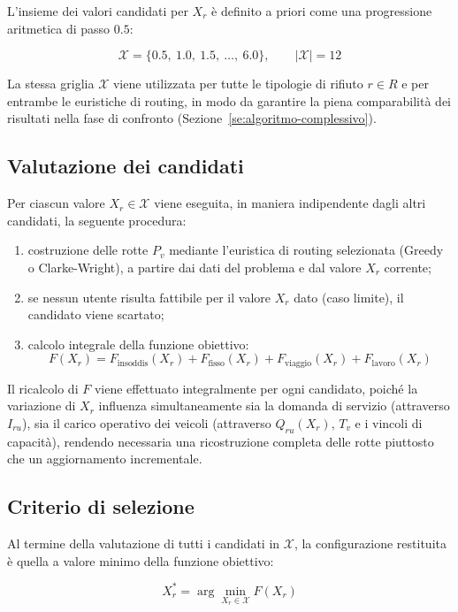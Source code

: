 L'insieme dei valori candidati per $X_r$ è definito a priori come una progressione aritmetica di passo $0.5$:

\[
\mathcal{X} = \{0.5,\ 1.0,\ 1.5,\ \dots,\ 6.0\}, \qquad |\mathcal{X}| = 12
\]

La stessa griglia $\mathcal{X}$ viene utilizzata per tutte le tipologie di rifiuto $r \in R$ e per entrambe le euristiche di routing, in modo da garantire la piena comparabilità dei risultati nella fase di confronto (Sezione~\ref{se:algoritmo-complessivo}).

\subsection{Valutazione dei candidati}

Per ciascun valore $X_r \in \mathcal{X}$ viene eseguita, in maniera indipendente dagli altri candidati, la seguente procedura:

\begin{enumerate}
	\item costruzione delle rotte $P_v$ mediante l'euristica di routing selezionata (Greedy o Clarke-Wright), a partire dai dati del problema e dal valore $X_r$ corrente;
	\item se nessun utente risulta fattibile per il valore $X_r$ dato (caso limite), il candidato viene scartato;
	\item calcolo integrale della funzione obiettivo:
	\[
	F(X_r) = F_{\text{insoddis}}(X_r) + F_{\text{fisso}}(X_r) + F_{\text{viaggio}}(X_r) + F_{\text{lavoro}}(X_r)
	\]
\end{enumerate}

Il ricalcolo di $F$ viene effettuato integralmente per ogni candidato, poiché la variazione di $X_r$ influenza simultaneamente sia la domanda di servizio (attraverso $I_{ru}$), sia il carico operativo dei veicoli (attraverso $Q_{ru}(X_r)$, $T_v$ e i vincoli di capacità), rendendo necessaria una ricostruzione completa delle rotte piuttosto che un aggiornamento incrementale.

\subsection{Criterio di selezione}

Al termine della valutazione di tutti i candidati in $\mathcal{X}$, la configurazione restituita è quella a valore minimo della funzione obiettivo:

\begin{equation}
	X_r^{*} = \arg\min_{X_r \in \mathcal{X}} F(X_r)
\end{equation}

